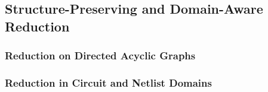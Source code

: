 \subsection{Structure-Preserving and Domain-Aware Reduction}
\label{sec:relwork:domain}

\subsubsection{Reduction on Directed Acyclic Graphs}
\label{sec:relwork:domain:dag}

\subsubsection{Reduction in Circuit and Netlist Domains}
\label{sec:relwork:domain:circuits}
